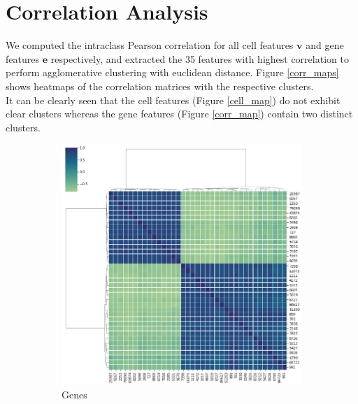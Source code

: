 \documentclass[bsc,frontabs,twoside,singlespacing,parskip,deptreport]{infthesis}     %
\let\Oldsection\section
\renewcommand{\section}{\FloatBarrier\Oldsection}
\begin{document}
\section{Correlation Analysis}
We computed the intraclass Pearson correlation for all cell features \(\mathbf{v}\) and gene features \(\mathbf{e}\) respectively, and extracted the 35 features with highest correlation to perform agglomerative clustering with euclidean distance. Figure \ref{corr_maps} shows heatmaps of the correlation matrices with the respective clusters.  \\
It can be clearly seen that the cell features (Figure \ref{cell_map}) do not exhibit clear clusters whereas the gene features (Figure \ref{corr_map}) contain two distinct clusters. 
\begin{figure}[h!]
\centering
\begin{subfigure}{.5\textwidth}
  \centering
  \includegraphics[width=.9\linewidth]{images/gene_corr.png}
  \caption{Genes}
  \label{gene_map}
\end{subfigure}%
\begin{subfigure}{.5\textwidth}
  \centering

\end{subfigure}
\end{figure}
\end{document}
